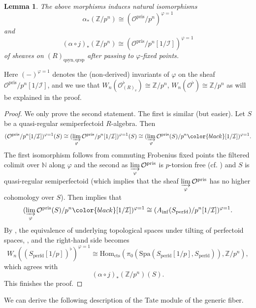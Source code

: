 \documentclass{amsart}
\theoremstyle{plain}
\newtheorem{lemma}[theorem]{Lemma}
\theoremstyle{definition}
\renewcommand{\inf}{\mathrm{inf}}
\newcommand{\N}{\mathbb{N}}
\newcommand{\pris}{\mathrm{pris}}
\newcommand{\Spa}{\mathrm{Spa}}
\newcommand{\Z}{\mathbb{Z}}
\newcommand{\red}[1]{{\color{black} #1}}
\newcommand{\green}[1]{{\color{black}#1}}
\begin{document}
\begin{lemma}
  \label{sec:etale-comparison-p-1-frobenius-fixed-points-of-the-prismatic-structure-sheaf} \red{The above morphisms induces} natural isomorphisms
  $$
  \alpha_\ast(\Z/p^n)\cong (\mathcal{O}^\pris/p^n)^{\varphi=1}
  $$
  and
  $$
  (\alpha\circ j)_\ast(\Z/p^n)\cong (\mathcal{O}^\pris/p^n[1/\mathcal{I}])^{\varphi=1}
  $$
  of sheaves on $(R)_{\mathrm{qsyn},\mathrm{qrsp}}$ \red{after passing to $\varphi$-fixed points}.
\end{lemma}
Here $(-)^{\varphi=1}$ denotes the (non-derived) invariants of $\varphi$ on the sheaf $\mathcal{O}^\pris/p^n[1/\mathcal{I}]$, \red{and we use that $W_n(\mathcal{O}^\flat_{(R)_v})\cong \Z/p^n$, $W_n(\mathcal{O}^\flat)\cong \Z/p^n$ as will be explained in the proof}.
\begin{proof}
  We only prove the second statement. The first is similar (but easier). Let $S$ be a quasi-regular semiperfectoid $R$-algebra. Then
  $$
(\mathcal{O}^\pris/p^n[1/\mathcal{I}])^{\varphi=1}(S) \cong (\varinjlim\limits_{\varphi}\mathcal{O}^\pris/p^n[1/\mathcal{I}])^{\varphi=1}(S)\cong (\varinjlim\limits_{\varphi}\mathcal{O}^\pris(S)/p^n\red{[1/\mathcal{I}]})^{\varphi=1}.
$$
The first isomorphism follows from commuting \green{Frobenius fixed points the filtered colimit over $\N$ along $\varphi$} and the second as \red{$\varinjlim\limits_{\varphi}\mathcal{O}^\pris$ is $p$-torsion free (cf. \cite[Proof of Lemma 2.28]{bhatt_scholze_prisms_and_prismatic_cohomology}) and $S$ is quasi-regular semiperfectoid (which implies that the sheaf $\varinjlim\limits_{\varphi}\mathcal{O}^\pris$ has no higher cohomology over $S$)}.
Then \cite[Lemma 9.2]{bhatt_scholze_prisms_and_prismatic_cohomology} implies that
$$
(\varinjlim\limits_{\varphi}\mathcal{O}^\pris(S)/p^n\red{[1/\mathcal{I}]})^{\varphi=1}\cong (A_{\inf}(S_{\mathrm{perfd}})/p^n[1/\mathcal{I}])^{\varphi=1}.
$$
By \cite[Lemma 9.3]{bhatt_scholze_prisms_and_prismatic_cohomology}, the equivalence of underlying topological spaces under tilting of perfectoid spaces, \cite[Theorem 7.1.1]{scholze2020berkeley}, and \cite[Proposition 3.2.7]{kedlaya_liu_relative_p_adic_hodge_theory_foundations} the right-hand side becomes
$$
W_n((S_{\mathrm{perfd}}[1/p])^\flat)^{\varphi=1}\cong \mathrm{Hom}_{\mathrm{cts}}(\pi_0(\Spa(S_{\mathrm{perfd}}[1/p],S_{\mathrm{perfd}})),\Z/p^n),
$$
which agrees with
$$
(\alpha\circ j)_\ast(\Z/p^n)(S).
$$
This finishes the proof.
\end{proof}

We can derive the following description of the Tate module of the generic fiber.
\end{document}
